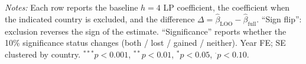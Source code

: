 \begin{table}[htbp]
\begin{threeparttable}
\begin{tabular}{l rrrll}
\bottomrule
\end{tabular}
\begin{tablenotes}\small
\item \textit{Notes:} Each row reports the baseline $h=4$ LP coefficient, the coefficient when the indicated country is excluded, and the difference $\Delta = \hat\beta_{\text{LOO}} - \hat\beta_{\text{full}}$. ``Sign flip'': exclusion reverses the sign of the estimate. ``Significance'' reports whether the 10\% significance status changes (both / lost / gained / neither). Year FE; SE clustered by country. $^{***}p<0.001$, $^{**}p<0.01$, $^{*}p<0.05$, $^{\cdot}p<0.10$.
\end{tablenotes}\end{threeparttable}\end{table}
